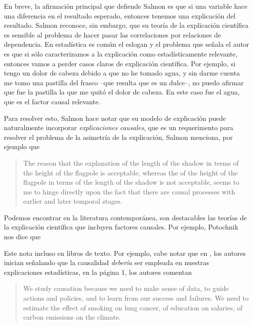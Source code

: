 En breve, la afirmación principal que defiende Salmon es que si una
variable hace una diferencia en el resultado esperado, entonces
tenemos una explicación del resultado. Salmon reconoce, sin embargo,
que su teoría de la explicación científica es sensible al problema
de hacer pasar las correlaciones por relaciones de dependencia. En
estadística es común el eslogan  y el problema que señala el autor es que si sólo
caracterizamos a la explicación como estadísticamente relevante,
entonces vamos a perder casos claros de explicación científica. Por
ejemplo, si tengo un dolor de cabeza debido a que no he tomado agua,
y sin darme cuenta me tomo una pastilla del frasco --que resulta que
es un dulce--, no puedo afirmar que fue la pastilla la que me quitó
el dolor de cabeza. En este caso fue el agua, que es el factor
causal relevante.

Para resolver esto, Salmon hace notar que su modelo de explicación
puede naturalmente incorporar \emph{explicaciones causales}, que es
un requerimento para resolver el problema de la asimetría de la
explicación, Salmon menciona, por ejemplo que

\begin{quote}
	The reason that the explanation of the length of the shadow in
	terms of the height of the flagpole is acceptable, whereas the
	 of the height of the flagpole in terms of the
	length of the shadow is not acceptable, seems to me to hinge
	directly upon the fact that there are causal processes with
	earlier and later temporal stages.
\end{quote}

Podemos encontrar en la literatura contemporánea, son destacables
las teorías de la explicación científica que incluyen factores
causales. Por ejemplo, Potochnik nos dice que  \parencite[][p.~24]{Potochnik2017-POTIAT-3}

Este  nota incluso en libros de texto. Por ejemplo, cabe notar que en \cite{Pearl2016}, los autores inician señalando que la causalidad \emph{debería} ser empleada en nuestras explicaciones estadísticas, en la página 1, los autores comentan

\begin{quote}
	We study causation because we need to make sense of data, to
	guide actions and policies, and to learn from our success and
	failures. We need to estimate the effect of smoking on lung
	cancer, of education on salaries, of carbon emissions on the
	climate.
\end{quote}

